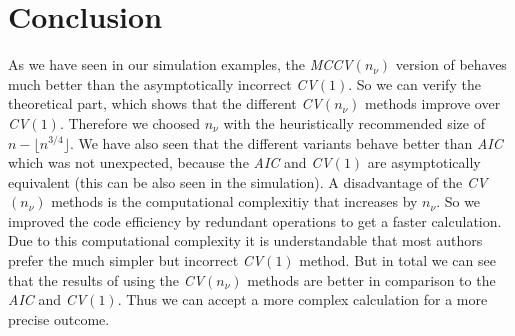 \documentclass[Research_Module_ES.tex]{subfiles}
\begin{document}
\section{Conclusion}
As we have seen in our simulation examples, the \textit{MCCV$(n_\nu)$} version of \cite{shao} behaves much better than the asymptotically incorrect \textit{CV$(1)$}. So we can verify the theoretical part, which shows that the different \textit{CV$(n_\nu)$} methods improve over \textit{CV$(1)$}. Therefore we choosed $n_\nu$ with the heuristically recommended size of $n-\lfloor
n^{3/4}\rfloor$. We have also seen that the different variants behave better than \textit{AIC} which was not unexpected, because the \textit{AIC} and \textit{CV$(1)$} are asymptotically equivalent (this can be also seen in the simulation). A disadvantage of the \textit{CV$(n_\nu)$} methods is the computational complexitiy that increases by $n_\nu$. So we improved the code efficiency by redundant operations to get a faster calculation. Due to this computational complexity it is understandable that most authors prefer the much simpler but incorrect \textit{CV$(1)$} method. But in total we can see that the results of using the \textit{CV$(n_\nu)$} methods are better in comparison to the \textit{AIC} and \textit{CV$(1)$}. Thus we can accept a more complex calculation for a more precise outcome. 
\end{document}
